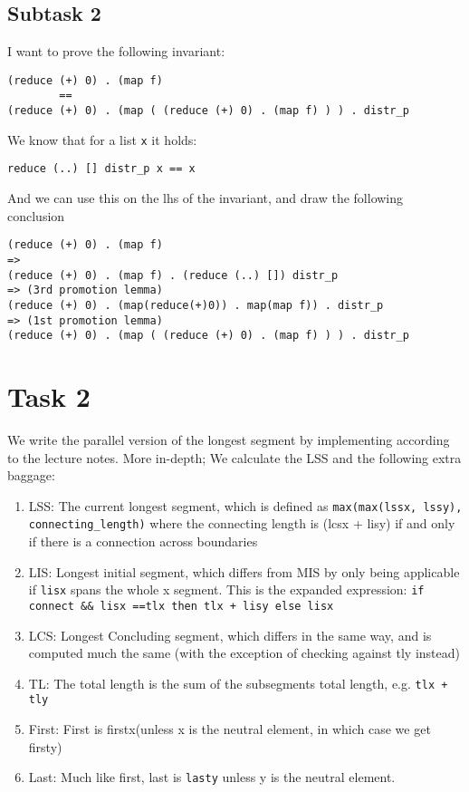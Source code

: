 \documentclass[11pt]{article}
\begin{document}
\subsection{Subtask 2}
\label{sec:org33e661e}
I want to prove the following invariant:
\begin{verbatim}
(reduce (+) 0) . (map f)
	    ==
(reduce (+) 0) . (map ( (reduce (+) 0) . (map f) ) ) . distr_p
\end{verbatim}
We know that for a list \texttt{x} it holds:
\begin{verbatim}
reduce (..) [] distr_p x == x
\end{verbatim}
And we can use this on the lhs of the invariant, and draw the following conclusion
\begin{verbatim}
(reduce (+) 0) . (map f)
=>
(reduce (+) 0) . (map f) . (reduce (..) []) distr_p
=> (3rd promotion lemma)
(reduce (+) 0) . (map(reduce(+)0)) . map(map f)) . distr_p
=> (1st promotion lemma)
(reduce (+) 0) . (map ( (reduce (+) 0) . (map f) ) ) . distr_p
\end{verbatim}

\section{Task 2}
\label{sec:org9b3cc5e}
We write the parallel version of the longest segment by implementing according to the lecture notes.  
More in-depth; We calculate the LSS and the following extra baggage:
\begin{enumerate}
\item LSS: The current longest segment, which is defined as \texttt{max(max(lssx, lssy), connecting\_length)}
where the connecting length is (lcsx + lisy) if and only if there is a connection across
boundaries
\item LIS: Longest initial segment, which differs from MIS by only being applicable if \texttt{lisx} spans the
whole x segment. This is the expanded expression: \texttt{if connect \&\& lisx ==tlx then tlx + lisy else lisx}
\item LCS: Longest Concluding segment, which differs in the same way, and is computed much the same (with
the exception of checking against tly instead)
\item TL: The total length is the sum of the subsegments total length, e.g. \texttt{tlx + tly}
\item First: First is firstx(unless x is the neutral element, in which case we get firsty)
\item Last: Much like first, last is \texttt{lasty} unless y is the neutral element.
\end{enumerate}
\end{document}
